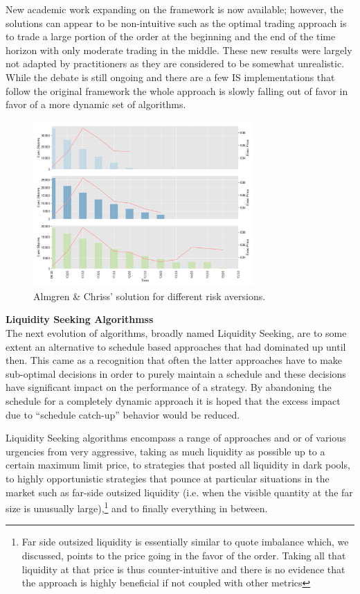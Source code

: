 New academic work expanding on the framework is now available; however, the solutions can appear to be non-intuitive such as the optimal trading approach is to trade a large portion of the order at the beginning and the end of the time horizon with only moderate trading in the middle. These new results were largely not adapted by practitioners as they are considered to be somewhat unrealistic. While the debate is still ongoing and there are a few IS implementations that follow the original framework the whole approach is slowly falling out of favor in favor of a more dynamic set of algorithms. \\

	\begin{figure}[!ht]
	\centering
	\includegraphics[width=0.75\textwidth]{chapters/chapter_exec_models/figures/is.png} 
	\caption{Almgren \& Chriss' solution for different risk aversions. \label{fig:is}}
	\end{figure}



\noindent\textbf{Liquidity Seeking Algorithmss} \\


The next evolution of algorithms, broadly named Liquidity Seeking, are to some extent an alternative to schedule based approaches that had dominated up until then. This came as a recognition that often the latter approaches have to make sub-optimal decisions in order to purely maintain a schedule and these decisions have significant impact on the performance of a strategy. By abandoning the schedule for a completely dynamic approach it is hoped that the excess impact due to ``schedule catch-up'' behavior would be reduced.


Liquidity Seeking algorithms encompass a range of approaches and or of various urgencies from very aggressive, taking as much liquidity as possible up to a certain maximum limit price, to strategies that posted all liquidity in dark pools, to highly opportunistic strategies that pounce at particular situations in the market such as far-side outsized liquidity (i.e. when the visible quantity at the far size is unusually large),\footnote{Far side outsized liquidity is essentially similar to quote imbalance which, we discussed, points to the price going in the favor of the order. Taking all that liquidity at that price is thus counter-intuitive and there is no evidence that the approach is highly beneficial if not coupled with other metrics} and to finally everything in between.


